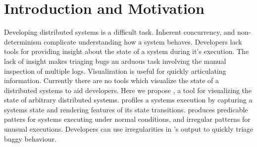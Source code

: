 \section{Introduction and Motivation}
\label{sec:intro}

Developing distributed systems is a difficult task. Inherent
concurrency, and non-determinism complicate understanding how a system
behaves. Developers lack tools for providing insight about the state
of a system during it's execution.  The lack of insight makes triaging
bugs an arduous task involving the manual inspection of multiple logs.
Visualization is useful for quickly articulating information.
Currently there are no tools which visualize the state of a
distributed systems to aid developers. Here we propose \dviz, a tool
for visualizing the state of arbitrary distributed systems. \dviz
profiles a systems execution by capturing a systems state and
rendering features of its state transitions. \dviz produces predicable
patters for systems executing under normal conditions, and irregular
patterns for unusual executions.  Developers can use irregularities in
\dviz's output to quickly triage buggy behaviour.
